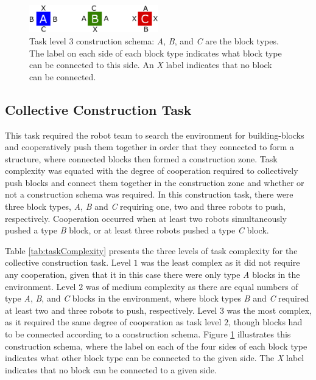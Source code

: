 \documentclass[conference]{IEEEtran}
\begin{document}
\begin{figure}[t]
	\centering
	\includegraphics[width=0.5\textwidth]{ConstructionSchema.eps}
	\caption{Task level 3 construction schema: \textit{A}, \textit{B}, and \textit{C} are the block types.  The label on
each side of each block type indicates what block type can be connected to this side.  An \textit{X} label indicates
that no block can be connected.}\label{fig:constructionSchema}
\end{figure}

\subsection{Collective Construction Task}\label{subsec:constructionTask}
This task required the robot team to search the environment for building-blocks and
cooperatively push them together in order that they connected to form a structure,
where connected blocks then formed a construction zone.
Task complexity was equated with the degree of cooperation required to collectively
push blocks and connect them together in the construction zone and whether or not
a construction schema was required.
In this construction task, there were three block types, \textit{A}, \textit{B} and \textit{C}
requiring one, two and three robots to push, respectively.
Cooperation occurred when at least two robots simultaneously pushed a type \textit{B} block,
or at least three robots pushed a type \textit{C} block.

Table \ref{tab:taskComplexity} presents the three levels of task complexity for the
collective construction task.  Level $1$ was the least complex as it did not require
any cooperation, given that it in this case there were only type \textit{A}
blocks in the environment.
Level $2$ was of medium complexity as there are equal numbers of type \textit{A},
\textit{B}, and \textit{C} blocks in the environment, where block types \textit{B} and \textit{C} required
at least two and three robots to push, respectively.
Level $3$ was the most complex, as it required the same degree of cooperation as task level
$2$, though blocks had to be connected according to a construction schema.
Figure \ref{fig:constructionSchema}
illustrates this construction schema, where the label on each of the
four sides of each block type indicates what other block type can be connected to the given side.
The \textit{X} label indicates that no block can be connected to a given side.
\end{document}

